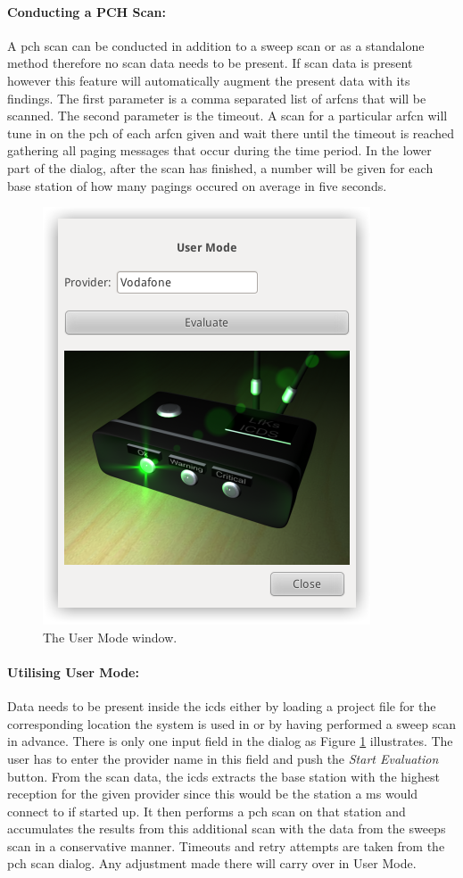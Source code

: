 \paragraph{Conducting a PCH Scan:} A \gls{pch} scan can be conducted in addition to a sweep scan or as a standalone method therefore no scan data needs to be present.
If scan data is present however this feature will automatically augment the present data with its findings.
The first parameter is a comma separated list of \glspl{arfcn} that will be scanned.
The second parameter is the timeout. 
A scan for a particular \gls{arfcn} will tune in on the \gls{pch} of each \gls{arfcn} given and wait there until the timeout is reached gathering all paging messages that occur during the time period.
In the lower part of the dialog, after the scan has finished, a number will be given for each base station of how many pagings occured on average in five seconds.

\begin{figure}
\centering
\includegraphics[width=.4\textwidth]{../Images/user_window}
\caption{The User Mode window.}
\label{fig:user_mode}
\end{figure}

\paragraph{Utilising User Mode:} Data needs to be present inside the \gls{icds} either by loading a project file for the corresponding location the system is used in or by having performed a sweep scan in advance.
There is only one input field in the dialog as Figure \ref{fig:user_mode} illustrates.
The user has to enter the provider name in this field and push the \emph{Start Evaluation} button.
From the scan data, the \gls{icds} extracts the base station with the highest reception for the given provider since this would be the station a \gls{ms} would connect to if started up.
It then performs a \gls{pch} scan on that station and accumulates the results from this additional scan with the data from the sweeps scan in a conservative manner.
Timeouts and retry attempts are taken from the \gls{pch} scan dialog.
Any adjustment made there will carry over in User Mode.

